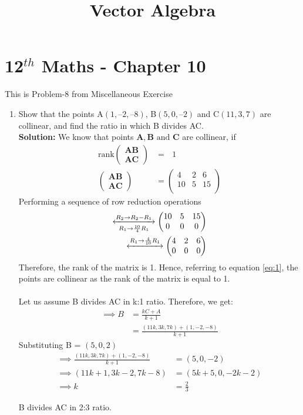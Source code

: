 \documentclass[12pt]{article}
\newcommand{\solution}{\noindent \textbf{Solution: }}
\newcommand{\myvec}[1]{\ensuremath{\begin{pmatrix}#1\end{pmatrix}}}
\let\vec\mathbf
\begin{document}
\begin{center}
\title{\textbf{Vector Algebra}}
\date{\vspace{-5ex}} %
\maketitle
\end{center}
\setcounter{page}{1}

\section{12$^{th}$ Maths - Chapter 10}
This is Problem-8 from Miscellaneous Exercise
\begin{enumerate}
\item Show that the points A$(1, – 2, – 8)$, B$(5, 0, – 2)$ and C$(11, 3, 7)$ are collinear, and
find the ratio in which B divides AC.\\
\solution 
 We know that points $\vec{A}, \vec{B} \text{ and } \vec{C}$ are collinear, if
\begin{align}
  \label{eq:1}
\text{rank}\myvec{ 
	\vec{AB} \\ \vec{AC}
}    &= \text{ } 1 \\   
\myvec{ 
\vec{AB} \\
\vec{AC}
}    &=   		\myvec{
        		4 & 2 & 6\\
        		10 & 5 & 15 \\
}
\end{align}
Performing a sequence of row reduction operations \\
\begin{align}
\xleftrightarrow[{R_1\rightarrow \frac{10}{4}R_1}]{{R_2\rightarrow R_2-R_1}}  \myvec{
  10 & 5 & 15 \\
  0 & 0 & 0 \\
}    \\
\xleftrightarrow[]{{R_1\rightarrow \frac{4}{10}R_1}}  \myvec{
  4 & 2 & 6\\
  0 & 0 & 0\\
}
\end{align}
Therefore, the rank of the matrix is 1. Hence, referring to equation \ref{eq:1}, the points are collinear as the rank of the matrix is equal to 1.\\ \\

Let us assume B divides AC in k:1 ratio. Therefore, we get:
\begin{align}
    \implies B &= \frac{kC+A}{k+1}\\
    \label{eq:5}
    &= \frac{(11k,3k,7k)+(1,-2,-8)}{k+1}
    \label{eq:6}
\end{align}
Substituting B = $(5,0,2)$
\begin{align}
    \implies \frac{(11k,3k,7k)+(1,-2,-8)}{k+1} &= (5,0,-2)\\
    \label{eq:7}
     \implies (11k+1,3k-2,7k-8) &= (5k+5,0,-2k-2)\\
    \label{eq:8}
    \implies k &= \frac{2}{3}
    \label{eq:9}
\end{align}

B divides AC in 2:3 ratio.

\end{enumerate}
\end{document}

